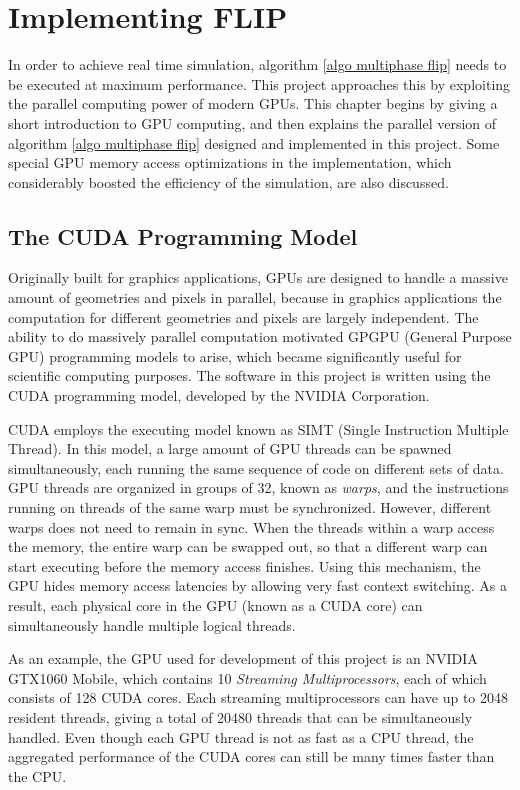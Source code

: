 


\chapter{Implementing FLIP}
\label{chapter flip impl}

In order to achieve real time simulation, algorithm \ref{algo multiphase flip} needs to be executed at maximum performance. This project approaches this by exploiting the parallel computing power of modern GPUs. This chapter begins by giving a short introduction to GPU computing, and then explains the parallel version of algorithm \ref{algo multiphase flip} designed and implemented in this project. Some special GPU memory access optimizations in the implementation, which considerably boosted the efficiency of the simulation, are also discussed. 

\section{The CUDA Programming Model}

Originally built for graphics applications, GPUs are designed to handle a massive amount of geometries and pixels in parallel, because in graphics applications the computation for different geometries and pixels are largely independent. The ability to do massively parallel computation motivated GPGPU (General Purpose GPU) programming models to arise, which became significantly useful for scientific computing purposes. The software in this project is written using the CUDA programming model, developed by the NVIDIA Corporation.

CUDA employs the executing model known as SIMT (Single Instruction Multiple Thread). In this model, a large amount of GPU threads can be spawned simultaneously, each running the same sequence of code on different sets of data. GPU threads are organized in groups of 32, known as \textit{warps}, and the instructions running on threads of the same warp must be synchronized. However, different warps does not need to remain in sync. When the threads within a warp access the memory, the entire warp can be swapped out, so that a different warp can start executing before the memory access finishes. Using this mechanism, the GPU hides memory access latencies by allowing very fast context switching. As a result, each physical core in the GPU (known as a CUDA core) can simultaneously handle multiple logical threads.

As an example, the GPU used for development of this project is an NVIDIA GTX1060 Mobile, which contains 10 \textit{Streaming Multiprocessors}, each of which consists of 128 CUDA cores. Each streaming multiprocessors can have up to 2048 resident threads, giving a total of 20480 threads that can be simultaneously handled. Even though each GPU thread is not as fast as a CPU thread, the aggregated performance of the CUDA cores can still be many times faster than the CPU.


